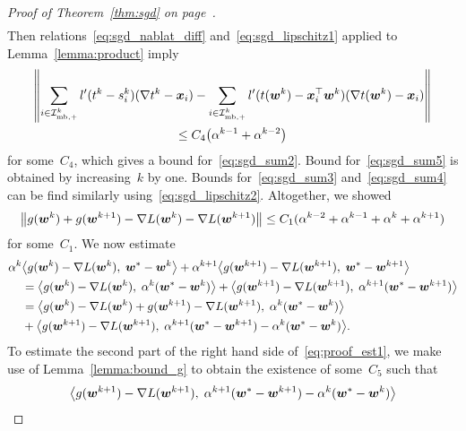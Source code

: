 \begin{proof}[Proof of Theorem~\ref{thm:sgd} on page~\pageref{thm:sgd}]
\begin{subequations}
\begin{align}
    \end{align}
  \end{subequations}
  Then relations~\eqref{eq:sgd_nablat_diff} and~\eqref{eq:sgd_lipschitz1} applied to Lemma~\ref{lemma:product} imply
  \begin{multline*}
    \norm{\sum_{i \in \Imbpos^k} l'(t^k - s_i^k)(\nabla t^k - \bm{x}_i) - \sum_{i \in \Imbpos^k} l'(t(\bm{w}^k) - \bm{x}_i^\top \bm{w}^k)(\nabla t(\bm{w}^k) - \bm{x}_i)}\\
      \le C_4 \Brac{\alpha^{k-1} + \alpha^{k-2}}
  \end{multline*}
  for some~$C_4$, which gives a bound for~\eqref{eq:sgd_sum2}. Bound for~\eqref{eq:sgd_sum5} is obtained by increasing~$k$ by one. Bounds for~\eqref{eq:sgd_sum3} and~\eqref{eq:sgd_sum4} can be find similarly using~\eqref{eq:sgd_lipschitz2}. Altogether, we showed
  \begin{equation}\label{eq:nec_cond3}
    \norm{g(\bm{w}^k) + g(\bm{w}^{k+1}) - \nabla L(\bm{w}^k) - \nabla L(\bm{w}^{k+1})}
      \le C_1(\alpha^{k-2} + \alpha^{k-1} + \alpha^{k} + \alpha^{k+1})
  \end{equation}
  for some~$C_1$. We now estimate
  \begin{equation}\label{eq:proof_est1}
    \begin{aligned}
      \alpha^k
      & \inner{ g(\bm{w}^{k})-\nabla L(\bm{w}^{k})}{\bm{w}^*-\bm{w}^{k}} + \alpha^{k+1}\inner{ g(\bm{w}^{k+1})-\nabla L(\bm{w}^{k+1})}{\bm{w}^*-\bm{w}^{k+1}} \\
      & = \inner{ g(\bm{w}^{k})-\nabla L(\bm{w}^{k})}{\alpha^k(\bm{w}^*-\bm{w}^{k})}
        + \inner{ g(\bm{w}^{k+1})-\nabla L(\bm{w}^{k+1})}{\alpha^{k+1}(\bm{w}^*-\bm{w}^{k+1})} \\
      & = \inner{ g(\bm{w}^{k})-\nabla L(\bm{w}^{k}) + g(\bm{w}^{k+1})-\nabla L(\bm{w}^{k+1})}{\alpha^k(\bm{w}^*-\bm{w}^{k})} \\
      & + \inner{ g(\bm{w}^{k+1})-\nabla L(\bm{w}^{k+1})}{\alpha^{k+1}(\bm{w}^*-\bm{w}^{k+1})-\alpha^k(\bm{w}^*-\bm{w}^{k})}.
    \end{aligned}
  \end{equation}
  To estimate the second part of the right hand side of~\eqref{eq:proof_est1}, we make use of Lemma~\ref{lemma:bound_g} to obtain the existence of some~$C_5$ such that
  \begin{equation}\label{eq:proof_est2}
    \begin{aligned}
    & \inner{ g(\bm{w}^{k+1})
    -\nabla L(\bm{w}^{k+1})}{\alpha^{k+1}(\bm{w}^*-\bm{w}^{k+1})-\alpha^k(\bm{w}^*-\bm{w}^{k})} \\

\end{aligned}
\end{equation}
\end{proof}
